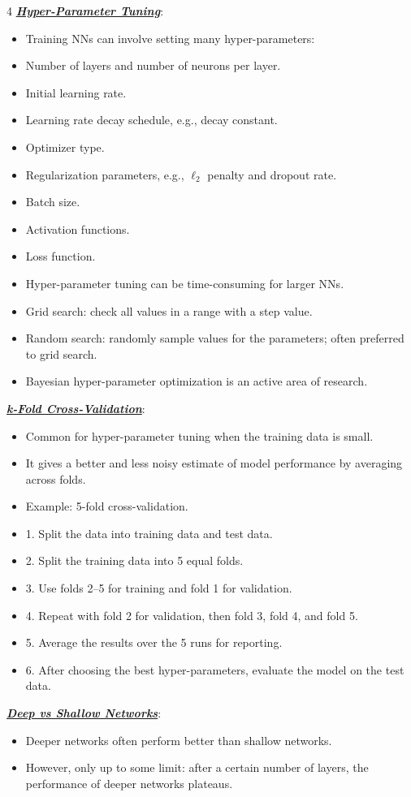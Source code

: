\documentclass[12pt]{article}
\newcommand{\bulletPoint}[1]{\ul{\textit{\textbf{#1}}}}
\begin{document}
\begin{multicols*}{4}
\bulletPoint{Hyper-Parameter Tuning}:
\begin{itemize}
\item Training NNs can involve setting many hyper-parameters:
\item Number of layers and number of neurons per layer.
\item Initial learning rate.
\item Learning rate decay schedule, e.g., decay constant.
\item Optimizer type.
\item Regularization parameters, e.g., $\ell_2$ penalty and dropout rate.
\item Batch size.
\item Activation functions.
\item Loss function.
\item Hyper-parameter tuning can be time-consuming for larger NNs.
\item Grid search: check all values in a range with a step value.
\item Random search: randomly sample values for the parameters; often preferred to grid search.
\item Bayesian hyper-parameter optimization is an active area of research.
\end{itemize}

\bulletPoint{k-Fold Cross-Validation}:
\begin{itemize}
\item Common for hyper-parameter tuning when the training data is small.
\item It gives a better and less noisy estimate of model performance by averaging across folds.
\item Example: 5-fold cross-validation.
\item 1. Split the data into training data and test data.
\item 2. Split the training data into 5 equal folds.
\item 3. Use folds 2--5 for training and fold 1 for validation.
\item 4. Repeat with fold 2 for validation, then fold 3, fold 4, and fold 5.
\item 5. Average the results over the 5 runs for reporting.
\item 6. After choosing the best hyper-parameters, evaluate the model on the test data.
\end{itemize}

\bulletPoint{Deep vs Shallow Networks}:
\begin{itemize}
\item Deeper networks often perform better than shallow networks.
\item However, only up to some limit: after a certain number of layers, the performance of deeper networks plateaus.
\end{itemize}


\end{multicols*}
\end{document}
